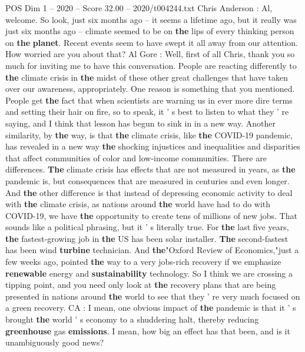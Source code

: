 \begin{textsample}{POS Dim 1 – 2020 – Score 32.00 – 2020/t004244.txt}  \label{ex:f1_pos_072}
Chris Anderson : Al, welcome.
So look, just six months ago -- it seems a lifetime ago, but it really was just six months ago -- climate seemed to be on \textbf{the} lips of every thinking person on \textbf{the} \textbf{planet}.
Recent events seem to have swept it all away from our attention.
How worried are you about that?
Al Gore : Well, first of all Chris, thank you so much for inviting me to have this conversation.
People are reacting differently to \textbf{the} climate crisis in \textbf{the} midst of these other great challenges that have taken over our awareness, appropriately.
One reason is something that you mentioned.
People get \textbf{the} fact that when scientists are warning us in ever more dire terms and setting their hair on fire, so to speak, it ' s best to listen to what they ' re saying, and I think that lesson has begun to sink in in a new way.
Another similarity, by \textbf{the} way, is that \textbf{the} climate crisis, like \textbf{the} COVID-19 pandemic, has revealed in a new way \textbf{the} shocking injustices and inequalities and disparities that affect communities of color and low-income communities.
There are differences. \textbf{The} climate crisis has effects that are not measured in years, as \textbf{the} pandemic is, but consequences that are measured in centuries and even longer.
And \textbf{the} other difference is that instead of depressing economic activity to deal with \textbf{the} climate crisis, as nations around \textbf{the} world have had to do with COVID-19, we have \textbf{the} opportunity to create tens of millions of new jobs.
That sounds like a political phrasing, but it ' s literally true.
For \textbf{the} last five years, \textbf{the} fastest-growing job in \textbf{the} US has been solar installer. \textbf{The} second-fastest has been wind \textbf{turbine} technician.
And \textbf{the}"Oxford Review of Economics,"just a few weeks ago, pointed \textbf{the} way to a very jobs-rich recovery if we emphasize \textbf{renewable} energy and \textbf{sustainability} technology.
So I think we are crossing a tipping point, and you need only look at \textbf{the} recovery plans that are being presented in nations around \textbf{the} world to see that they ' re very much focused on a green recovery.
CA : I mean, one obvious impact of \textbf{the} pandemic is that it ' s brought \textbf{the} world ' s economy to a shuddering halt, thereby reducing \textbf{greenhouse} gas \textbf{emissions}.
I mean, how big an effect has that been, and is it unambiguously good news?

\end{textsample}
